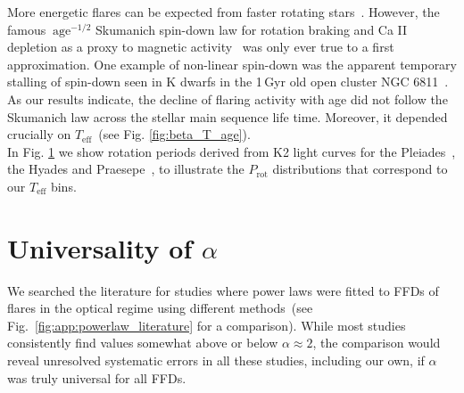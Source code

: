 \documentclass{aa}
\begin{document}
\begin{appendix}
\begin{figure}[ht!]
          \label{fig:rotation_histogram}
   \end{figure}
More energetic flares can be expected from faster rotating stars~\citep{candelaresi_superflare_2014, doorsselaere_stellar_2017, yang_flaring_2017}. However, the famous $~\mathrm{age}^{-1/2}$ Skumanich spin-down law for rotation braking and Ca II depletion as a proxy to magnetic activity~\citep{skumanich1972} was only ever true to a first approximation.
One example of non-linear spin-down was the apparent temporary stalling of spin-down seen in K dwarfs in the 1\,Gyr old open cluster NGC 6811~\citep{curtis2019}. As our results indicate, the decline of flaring activity with age did not follow the Skumanich law across the stellar main sequence life time. Moreover, it depended crucially on $T_\mathrm{eff}$~(see Fig. \ref{fig:beta_T_age}). 
\\
In Fig. \ref{fig:rotation_histogram} we show rotation periods derived from K2 light curves for the Pleiades~\citep{rebull_pleiadesrot_2016}, the Hyades and Praesepe~\citep{douglas2019}, to illustrate the $P_\mathrm{rot}$ distributions that correspond to our $T_\mathrm{eff}$ bins.
\section{Universality of $\alpha$}
\label{sec:app:universal_alpha}
We searched the literature for studies where power laws were fitted to FFDs of flares in the optical regime using different methods~(see Fig.~\ref{fig:app:powerlaw_literature} for a comparison). While most studies consistently find values somewhat above or below $\alpha\approx2$, the comparison would reveal unresolved systematic errors in all these studies, including our own, if $\alpha$ was truly universal for all FFDs.


\end{appendix}
\end{document}
